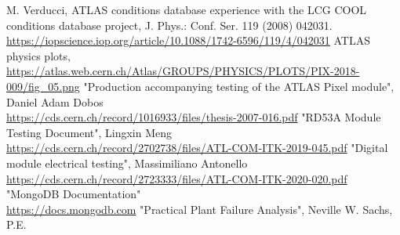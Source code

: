 \begin{thebibliography}{24}
M. Verducci, ATLAS conditions database experience with the LCG COOL conditions database project, J. Phys.: Conf. Ser. 119 (2008) 042031.
\url{https://iopscience.iop.org/article/10.1088/1742-6596/119/4/042031}
ATLAS physics plots, \url{https://atlas.web.cern.ch/Atlas/GROUPS/PHYSICS/PLOTS/PIX-2018-009/fig_05.png}
"Production accompanying testing of the ATLAS Pixel module", Daniel Adam Dobos\\
\url{https://cds.cern.ch/record/1016933/files/thesis-2007-016.pdf}
"RD53A Module Testing Document", Lingxin Meng\\ \url{https://cds.cern.ch/record/2702738/files/ATL-COM-ITK-2019-045.pdf}
"Digital module electrical testing", Massimiliano Antonello\\ \url{https://cds.cern.ch/record/2723333/files/ATL-COM-ITK-2020-020.pdf}
"MongoDB Documentation" \\ \url{https://docs.mongodb.com}
"Practical Plant Failure Analysis", Neville W. Sachs, P.E.
\end{thebibliography}
